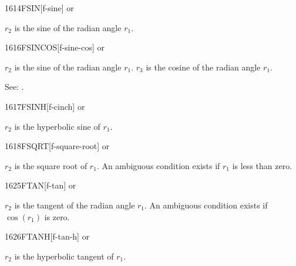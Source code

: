 \begin{newword}{1614}{FSIN}[f-sine]
	 or

	$r_2$ is the sine of the radian angle $r_1$.
\end{newword}


\begin{newword}{1616}{FSINCOS}[f-sine-cos]
	 or

	$r_2$ is the sine of the radian angle $r_1$. $r_3$ is the cosine
	of the radian angle $r_1$.

	\begin{rationale} %
		See: .
	\end{rationale}
\end{newword}


\begin{newword}{1617}{FSINH}[f-cinch]
	 or

	$r_2$ is the hyperbolic sine of $r_1$.
\end{newword}


\begin{newword}{1618}{FSQRT}[f-square-root]
	 or

	$r_2$ is the square root of $r_1$. An ambiguous condition exists
	if $r_1$ is less than zero.
\end{newword}


\begin{newword}{1625}{FTAN}[f-tan]
	 or

	$r_2$ is the tangent of the radian angle $r_1$. An ambiguous
	condition exists if $\cos(r_1)$ is zero.
\end{newword}


\begin{newword}{1626}{FTANH}[f-tan-h]
	 or

	$r_2$ is the hyperbolic tangent of $r_1$.
\end{newword}



